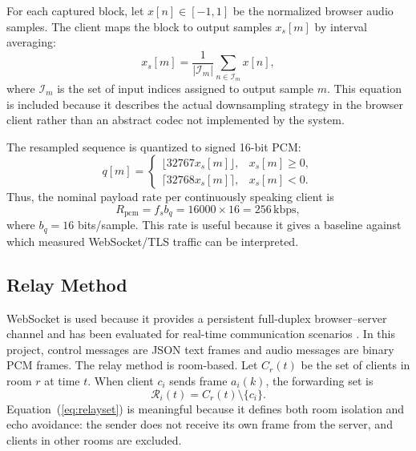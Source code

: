 \documentclass[conference]{IEEEtran}
\begin{document}
For each captured block, let $x[n]\in[-1,1]$ be the normalized browser audio samples. The client maps the block to output samples $x_s[m]$ by interval averaging:
\begin{equation}
    x_s[m] = \frac{1}{|\mathcal{I}_m|}
    \sum_{n \in \mathcal{I}_m} x[n],
    \label{eq:resampling}
\end{equation}
where $\mathcal{I}_m$ is the set of input indices assigned to output sample $m$. This equation is included because it describes the actual downsampling strategy in the browser client rather than an abstract codec not implemented by the system.

The resampled sequence is quantized to signed 16-bit PCM:
\begin{equation}
    q[m]=
    \begin{cases}
        \lfloor 32767x_s[m]\rfloor, & x_s[m]\geq 0,\\
        \lceil 32768x_s[m]\rceil, & x_s[m]<0.
    \end{cases}
    \label{eq:pcm}
\end{equation}
Thus, the nominal payload rate per continuously speaking client is
\begin{equation}
    R_{\mathrm{pcm}} = f_s b_q = 16000 \times 16 = 256\,\mathrm{kbps},
    \label{eq:payloadrate}
\end{equation}
where $b_q=16$ bits/sample. This rate is useful because it gives a baseline against which measured WebSocket/TLS traffic can be interpreted.

\subsection{Relay Method}

WebSocket is used because it provides a persistent full-duplex browser--server channel and has been evaluated for real-time communication scenarios \cite{ieee_websocket_realtime}. In this project, control messages are JSON text frames and audio messages are binary PCM frames. The relay method is room-based. Let $C_r(t)$ be the set of clients in room $r$ at time $t$. When client $c_i$ sends frame $a_i(k)$, the forwarding set is
\begin{equation}
    \mathcal{R}_i(t) = C_r(t)\setminus\{c_i\}.
    \label{eq:relayset}
\end{equation}
Equation~(\ref{eq:relayset}) is meaningful because it defines both room isolation and echo avoidance: the sender does not receive its own frame from the server, and clients in other rooms are excluded.
\end{document}
